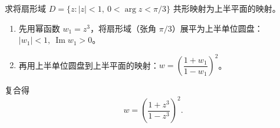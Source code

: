 \begin{example}[对数函数与扇形域]
  求将扇形域 \(D = \{z: |z| < 1,\ 0 < \arg z < \pi/3\}\) 共形映射为上半平面的映射。
\end{example}
\begin{solution}
  \begin{enumerate}
    \item 先用幂函数 \(w_1 = z^3\)，将扇形域（张角 \(\pi/3\)）展平为上半单位圆盘：\(|w_1|<1,\ \operatorname{Im} w_1 > 0\)。
    \item 再用上半单位圆盘到上半平面的映射：\(w = \left(\dfrac{1+w_1}{1-w_1}\right)^2\)。
  \end{enumerate}
  复合得
  \[
  w = \left(\frac{1+z^3}{1-z^3}\right)^2.
  \]
\end{solution}

